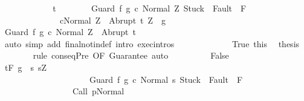 \begin{isabellebody}
\ \ \ \ \isamarkupfalse%
\isanewline
\ \ \ \ \ \ \isamarkupfalse%
\ t\isanewline
\ \ \ \ \ \ \isamarkupfalse%
\ {\isachardoublequoteopen}{\isasymGamma}{\isasymturnstile}{\isasymlangle}Guard\ f\ g\ c\ {\isacharcomma}Normal\ Z{\isasymrangle}\ {\isasymRightarrow}{\isasymnotin}{\isacharparenleft}{\isacharbraceleft}Stuck{\isacharbraceright}\ {\isasymunion}\ Fault\ {\isacharbackquote}\ {\isacharparenleft}{\isacharminus}F{\isacharparenright}{\isacharparenright}{\isachardoublequoteclose}\ \isanewline
\ \ \ \ \ \ \ \ \ \ \ \ \ \ {\isachardoublequoteopen}{\isasymGamma}{\isasymturnstile}{\isasymlangle}c{\isacharcomma}Normal\ Z{\isasymrangle}\ {\isasymRightarrow}\ Abrupt\ t{\isachardoublequoteclose}\ {\isachardoublequoteopen}Z\ {\isasymin}\ g{\isachardoublequoteclose}\isanewline
\ \ \ \ \ \ \isamarkupfalse%
\ {\isachardoublequoteopen}{\isasymGamma}{\isasymturnstile}{\isasymlangle}Guard\ f\ g\ c\ {\isacharcomma}Normal\ Z{\isasymrangle}\ {\isasymRightarrow}\ Abrupt\ t{\isachardoublequoteclose}\isanewline
\ \ \ \ \ \ \ \ \isamarkupfalse%
\ {\isacharparenleft}auto\ simp\ add{\isacharcolon}\ final{\isacharunderscore}notin{\isacharunderscore}def\ intro{\isacharcolon}\ exec{\isachardot}intros\ {\isacharparenright}\isanewline
\ \ \ \ \isamarkupfalse%
\ \isanewline
\ \ \ \ \isamarkupfalse%
\ True\ this\ \isamarkupfalse%
\ {\isacharquery}thesis\isanewline
\ \ \ \ \ \ \isamarkupfalse%
\ {\isacharparenleft}rule\ conseqPre\ {\isacharbrackleft}OF\ Guarantee{\isacharbrackright}{\isacharparenright}\ auto\ \isanewline
\ \ \isamarkupfalse%
\isanewline
\ \ \ \ \isamarkupfalse%
\ False\isanewline
\ \ \ \ \isamarkupfalse%
\ {\isachardoublequoteopen}{\isasymGamma}{\isacharcomma}{\isasymTheta}{\isasymturnstile}\isactrlsub t\isactrlbsub {\isacharslash}F\isactrlesub \ {\isacharparenleft}g\ {\isasyminter}\ {\isacharbraceleft}s{\isachardot}\ s{\isacharequal}Z\ {\isasymand}\ \isanewline
\ \ \ \ \ \ \ \ \ \ \ \ \ \ \ \ \ \ \ \ \ {\isasymGamma}{\isasymturnstile}{\isasymlangle}Guard\ f\ g\ c\ {\isacharcomma}Normal\ s{\isasymrangle}\ {\isasymRightarrow}{\isasymnotin}{\isacharparenleft}{\isacharbraceleft}Stuck{\isacharbraceright}\ {\isasymunion}\ Fault\ {\isacharbackquote}\ {\isacharparenleft}{\isacharminus}F{\isacharparenright}{\isacharparenright}\ {\isasymand}\ \isanewline
\ \ \ \ \ \ \ \ \ \ \ \ \ \ \ \ \ {\isasymGamma}{\isasymturnstile}Call\ p{\isasymdown}Normal\ {\isasymsigma}\ {\isasymand}\isanewline

\end{isabellebody}
